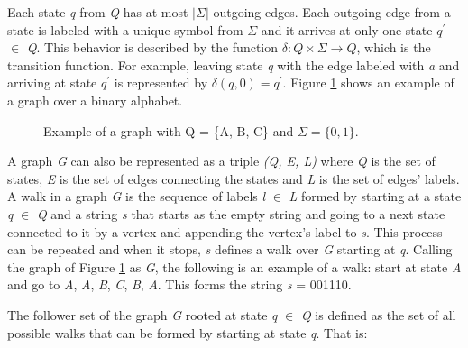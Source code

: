 {Each state \textit{q} from \textit{Q} has at most $|\Sigma|$ outgoing edges. Each outgoing edge from a state is labeled with a unique symbol from $\Sigma$ and it arrives at only one state \textit{$q^{\prime}$} $\in$ \textit{Q}. This behavior is described by the function $\delta : Q \times \Sigma \rightarrow Q$, which is the transition function. For example, leaving state \textit{q} with the edge labeled with \textit{a} and arriving at state \textit{$q^{\prime}$} is represented by $\delta(q, 0) = q^{\prime}$. Figure \ref{fig:graph} shows an example of a graph over a binary alphabet.

\begin{figure}
\centering
{}
\caption{Example of a graph with Q = \{A, B, C\} and $\Sigma = \{0, 1\}$.\label{fig:graph}}
\end{figure}

A graph \textit{G} can also be represented as a triple \textit{(Q, E, L)} where \textit{Q} is the set of states, \textit{E} is the set of edges connecting the states and \textit{L} is the set of edges' labels. A walk in a graph \textit{G} is the sequence of labels \textit{l} $\in$ \textit{L} formed by starting at a state \textit{q} $\in$ \textit{Q} and a string \textit{s} that starts as the empty string and going to a next state connected to it by a vertex and appending the vertex's label to \textit{s}. This process can be repeated and when it stops, \textit{s} defines a walk over \textit{G} starting at \textit{q}. Calling the graph of Figure \ref{fig:graph} as \textit{G}, the following is an example of a walk:  start at state \textit{A} and go to \textit{A}, \textit{A}, \textit{B}, \textit{C}, \textit{B}, \textit{A}. This forms the string \textit{s} = 001110.

\begin{definition}\label{def:followerset}
The follower set of the graph \textit{G} rooted at state \textit{q} $\in$ \textit{Q} is defined as the set of all possible walks that can be formed by starting at state \textit{q}. That is:
\end{definition}

}
